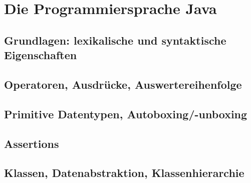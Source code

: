 
\chapter{Die Programmiersprache Java}
\section{Grundlagen: lexikalische und syntaktische Eigenschaften}

\section{Operatoren, Ausdrücke, Auswertereihenfolge}

\section{Primitive Datentypen, Autoboxing/-unboxing}

\section{Assertions}

\section{Klassen, Datenabstraktion, Klassenhierarchie}

